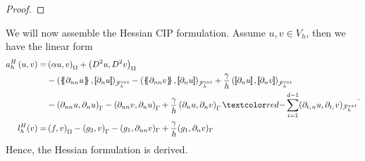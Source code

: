 \begin{proof}
\end{proof}


We will now assemble the Hessian CIP formulation. Assume $u,v \in V_{h}$, then we have the linear form
\begin{equation}
\begin{split}
a_{h}^{H} \left( u, v \right)   =&
    \left( \alpha  u, v \right) _{\Omega }   +  \left( D^2 u, D^2v \right) _{\Omega } \\
 & - \left( \mean{  \partial _{n n} u }, \jump{ \partial _{n }u} \right)_{\mathcal{F}_{h}^{int}}  -
 \left( \mean{ \partial _{n n} v }, \jump{ \partial _{n}u }      \right)_{\mathcal{F}_{h}^{int}}  + \frac{\gamma }{h}  \left( \jump{ \partial _{n} u}, \jump{ \partial _{n} v   }   \right)_{\mathcal{F}_{h}^{int}} \\
 & - \left(   \partial _{n n} u ,  \partial _{n }u \right)_{\Gamma }  -
 \left(  \partial _{n n} v ,  \partial _{n}u       \right)_{\Gamma }  + \frac{\gamma }{h}  \left(  \partial _{n} u,  \partial _{n} v      \right)_{\Gamma }   \red{-\sum_{i =1  }^{d-1} ( \partial   _{t_{i}n} u  ,  \partial   _{t_{i}}  v  )_{
 \mathcal{F}^{ext} _{h}  }} \\
 l_{h}^{H}( v)  =&  \left( f, v \right) _{\Omega }  - \left(g_{2}, v  \right) _{\Gamma } - ( g_{1}, \partial _{nn} v)_{\Gamma } +  \frac{\gamma }{h} ( g_{1} , \partial _{n} v)_{\Gamma }
\end{split}
.
\end{equation}
Hence, the Hessian formulation is derived.

